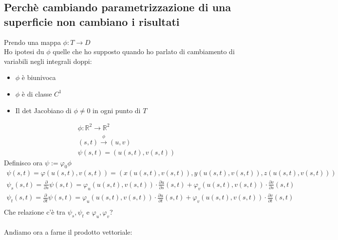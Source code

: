 \documentclass[a4paper, oneside]{article}
\begin{document}
\subsection{Perchè cambiando parametrizzazione di una superficie non cambiano i risultati}
Prendo una mappa $\phi : T \to D$\\
Ho ipotesi du $\phi$ quelle che ho supposto quando ho parlato di cambiamento di variabili negli integrali doppi:
\begin{itemize}
  \item $\phi$ è biunivoca
  \item $\phi$ è di classe $C^1$
  \item Il det Jacobiano di $\phi \neq 0$ in ogni punto di $T$
\end{itemize}
\begin{gather*}
  \phi : \mathbb{R}^2 \to \mathbb{R}^2\\
  (s,t) \overset{\phi}{\to} (u, v)\\
  \psi (s,t) = (u(s,t), v(s,t))
\end{gather*}
Definisco ora $\psi := \varphi_0 \phi$
\begin{gather*}
  \psi (s,t) = \varphi (u(s,t), v(s,t)) = (x(u(s,t), v(s,t)), y(u(s,t), v(s,t)), z(u(s,t), v(s,t)))\\
  \psi_s (s,t) = \frac{\partial}{\partial s} \psi(s,t) = \varphi_u (u(s,t), v(s,t)) \cdot \frac{\partial u}{\partial s} (s,t) + \varphi_v (u(s,t), v(s,t)) \cdot \frac{\partial v}{\partial s}(s,t)\\
  \psi_t (s,t) = \frac{\partial}{\partial t} \psi(s,t) = \varphi_u (u(s,t), v(s,t)) \cdot \frac{\partial u}{\partial t} (s,t) + \varphi_v (u(s,t), v(s,t)) \cdot \frac{\partial v}{\partial t}(s,t)\\
\end{gather*}
Che relazione c'è tra $\psi_s, \psi_t$ e $\varphi_u, \varphi_v$?\\
\hfill\\
Andiamo ora a farne il prodotto vettoriale:
\end{document}

